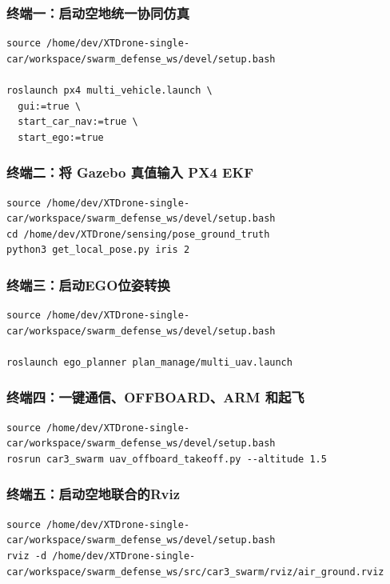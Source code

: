 \subsubsection{终端一：启动空地统一协同仿真}


\begingroup\scriptsize
\begin{verbatim}
source /home/dev/XTDrone-single-car/workspace/swarm_defense_ws/devel/setup.bash

roslaunch px4 multi_vehicle.launch \
  gui:=true \
  start_car_nav:=true \
  start_ego:=true
\end{verbatim}
\endgroup


\subsubsection{终端二：将 Gazebo 真值输入 PX4 EKF}
\begingroup\scriptsize
\begin{verbatim}
source /home/dev/XTDrone-single-car/workspace/swarm_defense_ws/devel/setup.bash
cd /home/dev/XTDrone/sensing/pose_ground_truth
python3 get_local_pose.py iris 2
\end{verbatim}
\endgroup

\subsubsection{终端三：启动EGO位姿转换}
\begingroup\scriptsize
\begin{verbatim}
source /home/dev/XTDrone-single-car/workspace/swarm_defense_ws/devel/setup.bash

roslaunch ego_planner plan_manage/multi_uav.launch
\end{verbatim}
\endgroup

\subsubsection{终端四：一键通信、OFFBOARD、ARM 和起飞}
\begingroup\scriptsize
\begin{verbatim}
source /home/dev/XTDrone-single-car/workspace/swarm_defense_ws/devel/setup.bash
rosrun car3_swarm uav_offboard_takeoff.py --altitude 1.5
\end{verbatim}
\endgroup
\subsubsection{终端五：启动空地联合的Rviz}
\begingroup\scriptsize
\begin{verbatim}
source /home/dev/XTDrone-single-car/workspace/swarm_defense_ws/devel/setup.bash
rviz -d /home/dev/XTDrone-single-car/workspace/swarm_defense_ws/src/car3_swarm/rviz/air_ground.rviz
\end{verbatim}
\endgroup



